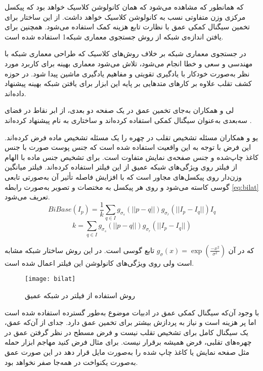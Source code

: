 که همانطور که مشاهده می‌شود که همان کانولوشن کلاسیک خواهد بود که پیکسل مرکزی وزن متفاوتی نسب به کانولوشن کلاسیک خواهد داشت. از این ساختار برای تخمین سیگنال کمکی عمق با نظارت تابع هزینه  کمک استفاده می‌شود. همچنین برای یافتن اندازه‌ی شبکه از روش جستجوی معماری شبکه1 
\cite{zoph2016neural}
استفاده شده است.

در جستجوی معماری شبکه بر خلاف روش‌های کلاسیک که طراحی معماری شبکه با مهندسی و سعی و خطا انجام می‌شود، تلاش می‌شود معماری بهینه برای کاربرد مورد نظر به‌صورت خودکار با یادگیری تقویتی و مفاهیم یادگیری ماشین پیدا شود. در حوزه کشف تقلب علاوه بر
\cite{zoph2016neural}
کارهای
\cite{yu2020fas,yu2020auto} 
متدهایی بر پایه این ابزار برای یافتن شبکه بهینه پیشنهاد داده‌اند.
 
 لی و همکاران به‌جای تخمین عمق در یک صفحه دو بعدی، از ابر نقاط در فضای سه‌بعدی به‌عنوان سیگنال کمکی استفاده کرده‌اند و ساختاری به نام  پیشنهاد کرده‌اند
\cite{li20203dpc}.
 
 یو و همکاران 
\cite{yu2020face}
 مسئله تشخیص تقلب در چهره را یک مسئله تشخیص ماده فرض کرده‌اند. این فرض با توجه به این واقعیت استفاده شده است که جنس پوست صورت با جنس کاغذ چاپ‌شده و جنس صفحه‌ی نمایش متفاوت است. برای تشخیص جنس ماده با الهام از فیلتر  روی ویژگی‌های شبکه عمیق از این فیلتر استفاده کرده‌اند. فیلتر  میانگین وزن‌دار روی پیکسل‌های مجاور است که با افزایش فاصله تأثیر آن به‌صورتی تابعی گوسی کاسته می‌شود و روی هر پیکسل به مختصات  و تصویر  به‌صورت رابطه 
\ref{eq:bilat}  
 تعریف می‌شود.
\begin{equation}\label{eq:bilat}
	BiBase(I_p)=\frac{1}{k}\sum_{q\in I}{g_{\sigma_s}(||p-q||)g_{\sigma_r}(||I_p-I_q||)I_q}
\end{equation}
\begin{equation}\label{eq:bilat}
	k=\sum_{q\in I}{g_{\sigma_s}(||p-q||)g_{\sigma_r}(||I_p-I_q||)}
	\nonumber
\end{equation}

که در آن
$g_\sigma (x) = \exp(\frac{-x^2}{\sigma^2})$
تابع گوسی است. در این روش ساختار شبکه مشابه
\cite{liu2018learning}
 است ولی روی ویژگی‌های کانولوشن این فیلتر اعمال شده است.
 
\begin{figure}[t]
 	\centerline{\texttt{[image: bilat]}}
 	\caption{روش استفاده از فیلتر  در شبکه عمیق \cite{yu2020face} }
 	\label{fig:bilat}
\end{figure}

با وجود آن‌که سیگنال کمکی عمق در ادبیات موضوع به‌طور گسترده استفاده شده است اما پر هزینه است و نیاز به پردازش بیشتر برای تخمین عمق دارد. جدای از آن‌که عمق، یک سیگنال کامل برای تشخیص تقلب نیست و فرض مسطح در نظر گرفتن عمق در چهره‌های تقلبی، فرض همیشه برقرار نیست. برای مثال فرض کنید مهاجم ابزار حمله مثل صفحه نمایش یا کاغذ چاپ شده را به‌صورت مایل قرار دهد در این صورت عمق به‌صورت یکنواخت در همه‌جا صفر نخواهد بود.

